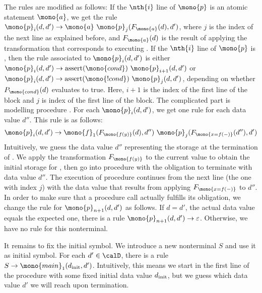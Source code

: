 \documentclass[../../diss.tex]{subfiles}
\begin{document}
The rules are modified as follows:
If the $\nth{i}$ line of $\mono{p}$ is an atomic statement $\mono{a}$, we get the rule $\mono{p}_{i}(d,d') \to \mono{a} \ \mono{p}_{j}(F_{\mono{a}}(d),d')$, where $j$ is the index of the next line as explained before, and $F_{\mono{a}}(d)$ is the result of applying the transformation that corresponds to executing .
If the $\nth{i}$ line of $\mono{p}$ is , then the rule associated to $\mono{p}_{i}(d,d')$ is either $\mono{p}_{i}(d,d') \to \text{assert}(\mono{cond}) \ \mono{p}_{i+1}(d,d')$ or $\mono{p}_{i}(d,d') \to \text{assert}(\mono{!cond}) \ \mono{p}_{j}(d,d')$, depending on whether $P_{\mono{cond}}(d)$ evaluates to true.
Here, $i+1$ is the index of the first line of the  block and $j$ is index of the first line of the  block.
The complicated part is modelling procedure .
For each $\mono{p}_{i}(d,d')$, we get one rule for each data value $d''$.
This rule is as follows:
\[
    \mono{p}_{i}(d,d')
    \to
    \mono{f}_{1}( F_{\mono{f(y)}}(d) ,d'')
    \
    \mono{p}_{j}( F_{\mono{x = f(-)}}(d'') , d')
\]
Intuitively, we guess the data value $d''$ representing the storage at the termination of .
We apply the transformation $F_{\mono{f(y)}}$ to the current value to obtain the initial storage for , then go into procedure  with the obligation to terminate with data value $d''$.
The execution of procedure \mono{p} continues from the next line (the one with index $j$) with the data value that results from applying $F_{\mono{x = f(-)}}$ to $d''$.
%
In order to make sure that a procedure call actually fulfills its obligation, we change the rule for $\mono{p}_{n+1}(d,d')$ as follows.
If $d = d'$, \ie the actual data value equals the expected one, there is a rule $\mono{p}_{n+1}(d,d') \to \eps$.
Otherwise, we have no rule for this nonterminal.

It remains to fix the initial symbol.
We introduce a new nonterminal $S$ and use it as initial symbol.
For each $d' \in \domain$, there is a rule $S \to {}_1 (d_\init,d')$.
Intuitively, this means we start in the first line of the procedure \mono{main} with some fixed initial data value $d_{\text{init}}$, but we guess which data value $d'$ we will reach upon termination.
\end{document}
